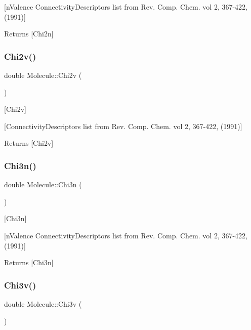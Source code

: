 \mbox{[}n\+Valence Connectivity\+Descriptors list from Rev. Comp. Chem. vol 2, 367-\/422, (1991)\mbox{]}

\begin{DoxyReturn}{Returns}
\mbox{[}Chi2n\mbox{]} 
\end{DoxyReturn}
\mbox{\label{class_molecule_a31a72034aa6769237eb794d923788584}} 
\subsubsection{\texorpdfstring{Chi2v()}{Chi2v()}}
{\footnotesize\ttfamily double Molecule\+::\+Chi2v (\begin{DoxyParamCaption}{ }\end{DoxyParamCaption})}



\mbox{[}Chi2v\mbox{]} 

\mbox{[}Connectivity\+Descriptors list from Rev. Comp. Chem. vol 2, 367-\/422, (1991)\mbox{]}

\begin{DoxyReturn}{Returns}
\mbox{[}Chi2v\mbox{]} 
\end{DoxyReturn}
\mbox{\label{class_molecule_ad4e37c52bc0660deeee68e487992e476}} 
\subsubsection{\texorpdfstring{Chi3n()}{Chi3n()}}
{\footnotesize\ttfamily double Molecule\+::\+Chi3n (\begin{DoxyParamCaption}{ }\end{DoxyParamCaption})}



\mbox{[}Chi3n\mbox{]} 

\mbox{[}n\+Valence Connectivity\+Descriptors list from Rev. Comp. Chem. vol 2, 367-\/422, (1991)\mbox{]}

\begin{DoxyReturn}{Returns}
\mbox{[}Chi3n\mbox{]} 
\end{DoxyReturn}
\mbox{\label{class_molecule_ac708655c8a81d9e25fe414f43b1d0b1c}} 
\subsubsection{\texorpdfstring{Chi3v()}{Chi3v()}}
{\footnotesize\ttfamily double Molecule\+::\+Chi3v (\begin{DoxyParamCaption}{ }\end{DoxyParamCaption})}



